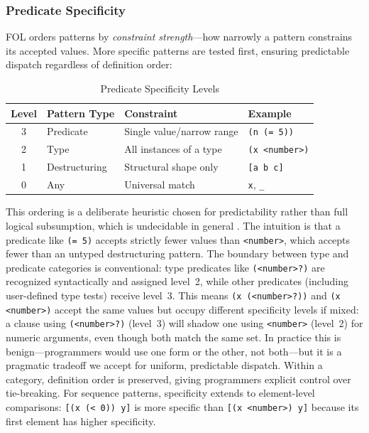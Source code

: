 \documentclass[sigconf,nonacm,review]{acmart}
\begin{document}
\subsubsection{Predicate Specificity}

FOL orders patterns by \textit{constraint strength}---how narrowly a pattern constrains its accepted values. More specific patterns are tested first, ensuring predictable dispatch regardless of definition order:

\begin{table}[htbp]
\caption{Predicate Specificity Levels}
\label{tab:specificity}
\begin{tabularx}{\columnwidth}{clXl}
\toprule
\textbf{Level} & \textbf{Pattern Type} & \textbf{Constraint} & \textbf{Example} \\
\midrule
3 & Predicate & Single value/narrow range & \texttt{(n (= 5))} \\
2 & Type & All instances of a type & \texttt{(x <number>)} \\
1 & Destructuring & Structural shape only & \texttt{[a b c]} \\
0 & Any & Universal match & \texttt{x}, \texttt{\_} \\
\bottomrule
\end{tabularx}
\end{table}

This ordering is a deliberate heuristic chosen for predictability rather than full logical subsumption, which is undecidable in general \cite{Ernst1998}. The intuition is that a predicate like \texttt{(= 5)}
accepts strictly fewer values than \texttt{<number>}, which accepts fewer than an untyped destructuring pattern. The boundary between type and predicate categories is conventional: type predicates like \texttt{(<number>?)}
are recognized syntactically and assigned level~2, while other predicates (including user-defined type tests) receive level~3. This means \texttt{(x (<number>?))} and \texttt{(x <number>)} accept the same values
but occupy different specificity levels if mixed: a clause using \texttt{(<number>?)} (level~3) will shadow one using \texttt{<number>} (level~2) for numeric arguments, even though both match the same set.
In practice this is benign---programmers would use one form or the other, not both---but it is a pragmatic tradeoff we accept for uniform, predictable dispatch. Within a category, definition order is preserved,
giving programmers explicit control over tie-breaking. For sequence patterns, specificity extends to element-level comparisons: \texttt{[(x (< 0)) y]} is more specific than \texttt{[(x <number>) y]} because its
first element has higher specificity.
\end{document}
